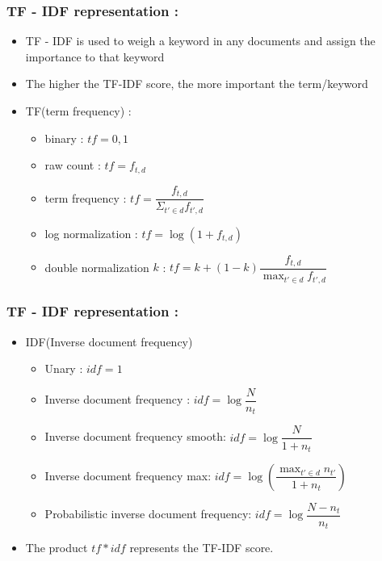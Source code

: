 \documentclass[11pt]{beamer}
\begin{document}
\begin{frame}
\frametitle{\textbf{TF - IDF representation : }}
	\begin{itemize}
	\pause\item TF - IDF is used to weigh a keyword in any documents and assign the importance to that keyword
	\item The higher the TF-IDF score, the more important the term/keyword
	\pause\item TF(term frequency) : 
	\begin{itemize}
		\item binary  : $tf = 0, 1 $
		\item raw count  : $tf = f_{t, d} $
		\item term frequency  : $tf = \dfrac{f_{t, d}}{\Sigma_{t'\in d}f_{t', d}} $
		\item log normalization  : $tf = \log(1 + f_{t, d})$
		\item double normalization $k$  : $tf = k + (1 - k) \dfrac{f_{t, d}}{\max_{t' \in d}f_{t',d}} $
	\end{itemize}
	\end{itemize}
\end{frame}

\begin{frame}
\frametitle{\textbf{TF - IDF representation : }}
\begin{itemize}
	\item IDF(Inverse document frequency)
	\begin{itemize}
		\pause\item Unary : $idf = 1$
		\item Inverse document frequency : $idf = \log \dfrac{N}{n_t}$
		\item Inverse document frequency smooth: $idf = \log\dfrac{N}{1+n_t}$
		\item Inverse document frequency max: $idf = \log\left(\dfrac{\max_{t'\in d}n_{t'}}{1 + n_t}\right)$
		\item Probabilistic inverse document frequency: $ idf = \log\dfrac{N-n_t}{n_t} $
	\end{itemize}
	\pause\item The product $tf * idf$ represents the TF-IDF score.
\end{itemize}
\end{frame}
\end{document}
